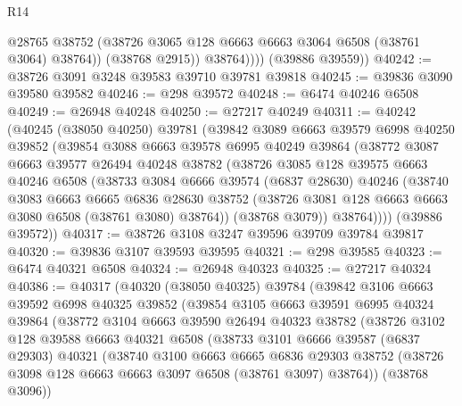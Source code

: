 \begin{lexlean}{R14}
\begin{coremodule}
                  @28765
                  @38752
                  (@38726 @3065 @128 @6663 @6663 @3064 @6508 (@38761 @3064) @38764))
                (@38768 @2915))
              @38764))))
      (@39886 @39559))
@40242 := @38726 @3091 @3248 @39583 @39710 @39781 @39818
@40245 := @39836 @3090 @39580 @39582
@40246 := @298 @39572
@40248 := @6474 @40246 @6508
@40249 := @26948 @40248
@40250 := @27217 @40249
@40311 := @40242
    (@40245
      (@38050 @40250)
      @39781
      (@39842
        @3089
        @6663
        @39579
        @6998
        @40250
        @39852
        (@39854
          @3088
          @6663
          @39578
          @6995
          @40249
          @39864
          (@38772
            @3087
            @6663
            @39577
            @26494
            @40248
            @38782
            (@38726
              @3085
              @128
              @39575
              @6663
              @40246
              @6508
              (@38733
                @3084
                @6666
                @39574
                (@6837 @28630)
                @40246
                (@38740
                  @3083
                  @6663
                  @6665
                  @6836
                  @28630
                  @38752
                  (@38726 @3081 @128 @6663 @6663 @3080 @6508 (@38761 @3080) @38764))
                (@38768 @3079))
              @38764))))
      (@39886 @39572))
@40317 := @38726 @3108 @3247 @39596 @39709 @39784 @39817
@40320 := @39836 @3107 @39593 @39595
@40321 := @298 @39585
@40323 := @6474 @40321 @6508
@40324 := @26948 @40323
@40325 := @27217 @40324
@40386 := @40317
    (@40320
      (@38050 @40325)
      @39784
      (@39842
        @3106
        @6663
        @39592
        @6998
        @40325
        @39852
        (@39854
          @3105
          @6663
          @39591
          @6995
          @40324
          @39864
          (@38772
            @3104
            @6663
            @39590
            @26494
            @40323
            @38782
            (@38726
              @3102
              @128
              @39588
              @6663
              @40321
              @6508
              (@38733
                @3101
                @6666
                @39587
                (@6837 @29303)
                @40321
                (@38740
                  @3100
                  @6663
                  @6665
                  @6836
                  @29303
                  @38752
                  (@38726 @3098 @128 @6663 @6663 @3097 @6508 (@38761 @3097) @38764))
                (@38768 @3096))

\end{coremodule}
\end{lexlean}
